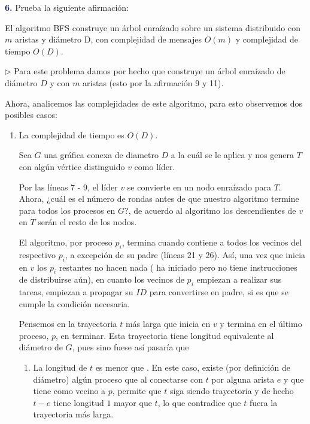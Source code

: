 \newpage
\textbf{\textcolor{MidnightBlue}{6.}}
Prueba la siguiente afirmación:

El algoritmo BFS construye un árbol enraízado
sobre un sistema distribuido con $m$ aristas
y diámetro D, con complejidad de mensajes
$O(m)$ y complejidad de tiempo $O(D)$. \newline

$\rhd$ Para este problema damos por hecho que
        construye un árbol enraízado
       de diámetro $D$ y con $m$ aristas (esto
       por la afirmación 9 y 11).

       Ahora, analicemos las complejidades de este algoritmo,
       para esto observemos dos posibles casos:
       \begin{enumerate}
       \item La complejidad de tiempo es $O(D)$.\newline 
       
       Sea $G$ una gráfica conexa de diametro $D$ a la cuál
       se le aplica  y nos genera $T$ con algún
       vértice distinguido $v$ como líder.
       
       Por las líneas 7 - 9, el líder $v$ se convierte en un
       nodo enraízado para $T$. Ahora, ¿cuál es el número de
       rondas antes de que nuestro algoritmo termine para todos
       los procesos en $G$?, de acuerdo al algoritmo los
       descendientes de $v$ en $T$ serán el resto de los nodos.
       
       El algoritmo, por proceso $p_i$, termina cuando
        contiene a todos los vecinos
       del respectivo $p_i$, a excepción de su padre (líneas
       21 y 26). Así, una vez que  inicia en $v$
       los $p_i$ restantes no hacen nada ( ha iniciado
       pero no tiene instrucciones de distribuirse aún), en cuanto
       los vecinos de $p_i$ empiezan a realizar sus tareas,
       empiezan a propagar su $ID$ para convertirse en padre, si
       es que se cumple la condición necesaria.
       
       Pensemos en la trayectoria $t$  más larga que inicia en $v$ y
       termina en el último proceso, $p$, en terminar. Esta
       trayectoria tiene longitud equivalente al diámetro de $G$,
       pues sino fuese así pasaría que
       \begin{enumerate}
       \item La longitud de $t$ es menor que . En este
       caso, existe (por definición de diámetro) algún proceso que
       al conectarse con $t$ por alguna arista $e$ y que tiene como
       vecino a $p$, permite que $t$ siga siendo trayectoria y de hecho
       $t-e$ tiene longitud $1$ mayor que $t$, lo que contradice que
       $t$ fuera la trayectoria más larga.
       

\end{enumerate}
\end{enumerate}
